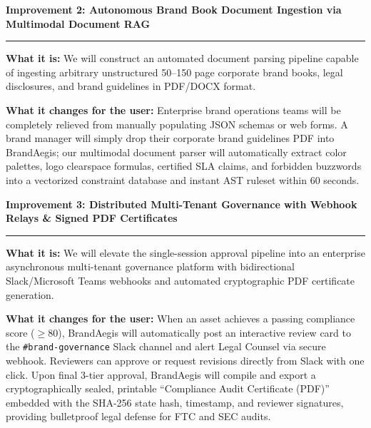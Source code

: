 \documentclass[10pt,a4paper]{article}
\begin{document}
\vspace{0.15cm}
\begin{tcolorbox}[colback=white,colframe=brandteal,arc=2mm,boxrule=0.8pt,left=3.5mm,right=3.5mm,top=2.5mm,bottom=2.5mm]
\textbf{\large\color{brandteal}Improvement 2: Autonomous Brand Book Document Ingestion via Multimodal Document RAG}
\vspace{0.15cm}
\hrule
\vspace{0.15cm}
\footnotesize
\textbf{What it is:} We will construct an automated document parsing pipeline capable of ingesting arbitrary unstructured 50--150 page corporate brand books, legal disclosures, and brand guidelines in PDF/DOCX format.

\textbf{What it changes for the user:} Enterprise brand operations teams will be completely relieved from manually populating JSON schemas or web forms. A brand manager will simply drop their corporate brand guidelines PDF into BrandAegis; our multimodal document parser will automatically extract color palettes, logo clearspace formulas, certified SLA claims, and forbidden buzzwords into a vectorized constraint database and instant AST ruleset within 60 seconds.
\end{tcolorbox}

\vspace{0.15cm}
\begin{tcolorbox}[colback=white,colframe=primarydark,arc=2mm,boxrule=0.8pt,left=3.5mm,right=3.5mm,top=2.5mm,bottom=2.5mm]
\textbf{\large\color{primarydark}Improvement 3: Distributed Multi-Tenant Governance with Webhook Relays \& Signed PDF Certificates}
\vspace{0.15cm}
\hrule
\vspace{0.15cm}
\footnotesize
\textbf{What it is:} We will elevate the single-session approval pipeline into an enterprise asynchronous multi-tenant governance platform with bidirectional Slack/Microsoft Teams webhooks and automated cryptographic PDF certificate generation.

\textbf{What it changes for the user:} When an asset achieves a passing compliance score ($\ge 80$), BrandAegis will automatically post an interactive review card to the \texttt{\#brand-governance} Slack channel and alert Legal Counsel via secure webhook. Reviewers can approve or request revisions directly from Slack with one click. Upon final 3-tier approval, BrandAegis will compile and export a cryptographically sealed, printable ``Compliance Audit Certificate (PDF)'' embedded with the SHA-256 state hash, timestamp, and reviewer signatures, providing bulletproof legal defense for FTC and SEC audits.
\end{tcolorbox}
\end{document}
